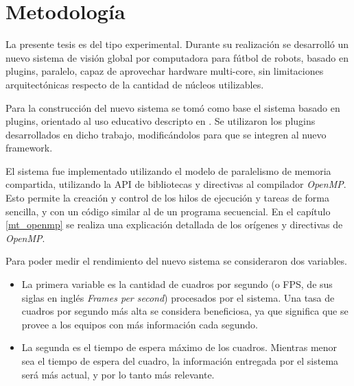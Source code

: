 
\section{Metodología}

\label{metodologia}

La presente tesis es del tipo experimental. Durante su realización se desarrolló
un nuevo sistema de visión global por computadora para fútbol de robots, basado
en plugins, paralelo, capaz de aprovechar hardware multi-core, sin limitaciones
arquitectónicas respecto de la cantidad de núcleos utilizables.

Para la construcción del nuevo sistema se tomó como base el sistema basado en
plugins, orientado al uso educativo descripto en \cite{torres2014}. Se
utilizaron los plugins desarrollados en dicho trabajo, modificándolos para que
se integren al nuevo framework.

El sistema fue implementado utilizando el modelo de paralelismo de memoria
compartida, utilizando la API de bibliotecas y directivas al compilador
\emph{OpenMP}. Esto permite la creación y control de los hilos de ejecución y
tareas de forma sencilla, y con un código similar al de un programa secuencial.
En el capítulo \ref{mt_openmp} se realiza una explicación detallada de los
orígenes y directivas de \emph{OpenMP}.

Para poder medir el rendimiento del nuevo sistema se consideraron dos variables.

\begin {itemize}

	\item	La primera variable es la cantidad de cuadros por segundo (o
		FPS, de sus siglas en inglés \emph{Frames per second})
		procesados por el sistema. Una tasa de cuadros por segundo más
		alta se considera beneficiosa, ya que significa que se provee a
		los equipos con más información cada segundo.

	\item	La segunda es el tiempo de espera máximo de los cuadros.
		Mientras menor sea el tiempo de espera del cuadro, la
		información entregada por el sistema será más actual, y por lo
		tanto más relevante.

\end {itemize}
